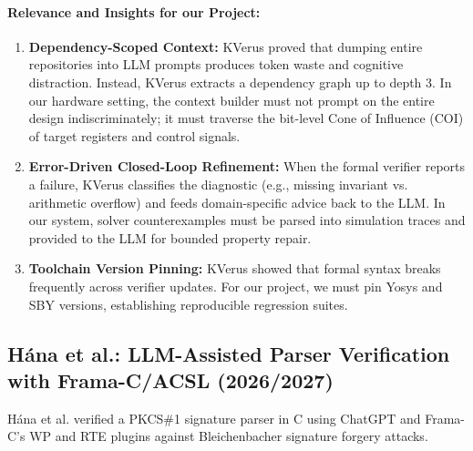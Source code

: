 \documentclass[11pt,a4paper]{article}
\begin{document}
\paragraph{Relevance and Insights for our Project:}
\begin{enumerate}
    \item \textbf{Dependency-Scoped Context:} KVerus proved that dumping entire repositories into LLM prompts produces token waste and cognitive distraction. Instead, KVerus extracts a dependency graph up to depth 3. In our hardware setting, the context builder must not prompt on the entire design indiscriminately; it must traverse the bit-level Cone of Influence (COI) of target registers and control signals.
    \item \textbf{Error-Driven Closed-Loop Refinement:} When the formal verifier reports a failure, KVerus classifies the diagnostic (e.g., missing invariant vs. arithmetic overflow) and feeds domain-specific advice back to the LLM. In our system, solver counterexamples must be parsed into simulation traces and provided to the LLM for bounded property repair.
    \item \textbf{Toolchain Version Pinning:} KVerus showed that formal syntax breaks frequently across verifier updates. For our project, we must pin Yosys and SBY versions, establishing reproducible regression suites.
\end{enumerate}

\subsection{Hána et al.: LLM-Assisted Parser Verification with Frama-C/ACSL (2026/2027)}
Hána et al. \cite{hana2027pkcs} verified a PKCS\#1 signature parser in C using ChatGPT and Frama-C's WP and RTE plugins against Bleichenbacher signature forgery attacks.
\end{document}
